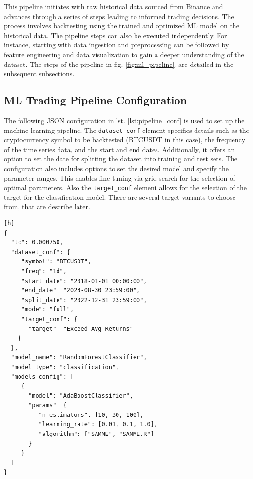 This pipeline initiates with raw historical data sourced from Binance and advances through a series of steps
leading to informed trading decisions. The process involves backtesting using the trained and optimized ML model on the historical data.
The pipeline steps can also be executed independently.
For instance, starting with data ingestion and preprocessing can be followed by feature engineering and data visualization to gain a deeper understanding of the dataset. The steps of the pipeline in  fig. \ref{fig:ml_pipeline}. are detailed in the subsequent subsections.

\subsection{ML Trading Pipeline Configuration}
The following JSON configuration in lst. \ref{lst:pipeline_conf} is used to set up the machine learning pipeline.
The \texttt{dataset\_conf} element specifies details such as the cryptocurrency symbol to be backtested (BTCUSDT in this case), the frequency of the time series data, and the start and end dates. Additionally, it offers an option to set the date for splitting the dataset into training and test sets.
The configuration also includes options to set the desired model and specify the parameter ranges. This enables fine-tuning via grid search for the selection of optimal parameters.
Also the \texttt{target\_conf} element allows for the selection of the target for the classification model. There are several target variants to choose from, that are describe later.




\begin{lstlisting}[style=jsonstyle, caption={Machine Learning Pipeline Configuration},  captionpos=b, label=lst:pipeline_conf][h]
{
  "tc": 0.000750,
  "dataset_conf": {
     "symbol": "BTCUSDT",
     "freq": "1d",
     "start_date": "2018-01-01 00:00:00",
     "end_date": "2023-08-30 23:59:00",
     "split_date": "2022-12-31 23:59:00",
     "mode": "full",
     "target_conf": {
       "target": "Exceed_Avg_Returns"
    }
  },
  "model_name": "RandomForestClassifier",
  "model_type": "classification",
  "models_config": [
     {
       "model": "AdaBoostClassifier",
       "params": {
          "n_estimators": [10, 30, 100],
          "learning_rate": [0.01, 0.1, 1.0],
          "algorithm": ["SAMME", "SAMME.R"]
       }
     }
  ]
}
\end{lstlisting}



